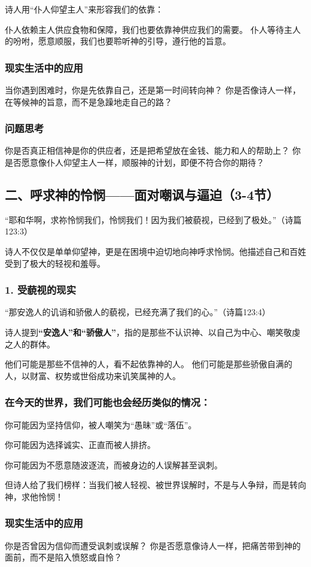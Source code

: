 \documentclass[a4paper, 12pt]{article}
\begin{document}
诗人用“仆人仰望主人”来形容我们的依靠：

仆人依赖主人供应食物和保障，我们也要依靠神供应我们的需要。
仆人等待主人的吩咐，愿意顺服，我们也要聆听神的引导，遵行他的旨意。
\subsubsection*{现实生活中的应用}
当你遇到困难时，你是先依靠自己，还是第一时间转向神？
你是否像诗人一样，在等候神的旨意，而不是急躁地走自己的路？
\subsubsection*{问题思考}
你是否真正相信神是你的供应者，还是把希望放在金钱、能力和人的帮助上？
你是否愿意像仆人仰望主人一样，顺服神的计划，即便不符合你的期待？
\subsection*{二、呼求神的怜悯——面对嘲讽与逼迫（3-4节）}
“耶和华啊，求祢怜悯我们，怜悯我们！因为我们被藐视，已经到了极处。”（诗篇123:3）

诗人不仅仅是单单仰望神，更是在困境中迫切地向神呼求怜悯。他描述自己和百姓受到了极大的轻视和羞辱。

\subsubsection*{1. 受藐视的现实}
“那安逸人的讥诮和骄傲人的藐视，已经充满了我们的心。”（诗篇123:4）

诗人提到\textbf{“安逸人”和“骄傲人”}，指的是那些不认识神、以自己为中心、嘲笑敬虔之人的群体。

他们可能是那些不信神的人，看不起依靠神的人。
他们可能是那些骄傲自满的人，以财富、权势或世俗成功来讥笑属神的人。

\subsubsection*{在今天的世界，我们可能也会经历类似的情况：}

\hspace{0.6cm}你可能因为坚持信仰，被人嘲笑为“愚昧”或“落伍”。

你可能因为选择诚实、正直而被人排挤。

你可能因为不愿意随波逐流，而被身边的人误解甚至讽刺。

但诗人给了我们榜样：当我们被人轻视、被世界误解时，不是与人争辩，而是转向神，求他怜悯！

\subsubsection*{现实生活中的应用}
你是否曾因为信仰而遭受讽刺或误解？
你是否愿意像诗人一样，把痛苦带到神的面前，而不是陷入愤怒或自怜？
\end{document}
